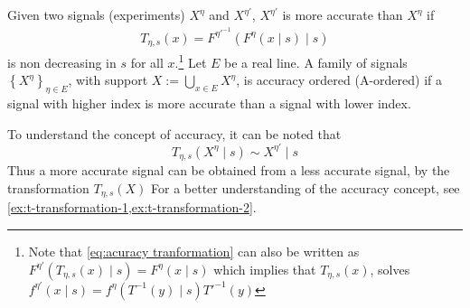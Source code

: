 \begin{definition}\label{def:accuracy}
\parencite{Persico2000Information} Given two signals (experiments) $X^{\eta}$ and $X^{\eta'}$,  $X^{\eta'}$ is more accurate than $X^{\eta}$ if
\begin{align}
    	T_{\eta,s}(x)=F^{\eta'^{-1}}(F^{\eta}(x\mid s)\mid s)\label{eq:acuracy tranformation}
\end{align}
is non decreasing in $s$ for all $x$.\footnote{Note that \cref{eq:acuracy tranformation} can also be written as $F^{\eta'}(T_{\eta,s}(x)\mid s)=F^{\eta}(x\mid s)$ which implies that $T_{\eta,s}(x)$, solves $f^{\eta'}(x\mid s)=f^\eta(T^{-1}(y)\mid s)T'^{-1}(y)$} Let $E$ be a real line. A family of signals $\left \{ X^{\eta}\right \} _{\eta\in E}$, with support $X:=\bigcup_{x\in E}X^\eta$, is accuracy ordered (A-ordered) if a signal with higher index is more accurate than a signal with lower index.
\end{definition}

To understand the concept of accuracy, it can be noted that
\[
	T_{\eta,s}(X^{\eta}\mid s)\sim X^{\eta'}\mid s
\]
Thus a more accurate signal can be obtained from a less accurate signal, by the transformation $T_{\eta,s}(X)$  For a better understanding of the accuracy concept, see \cref{ex:t-transformation-1,ex:t-transformation-2}.

